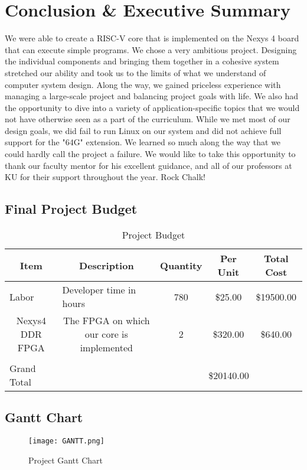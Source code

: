 \documentclass{article}
\begin{document}
\section{Conclusion \& Executive Summary}
We were able to create a RISC-V core that is implemented on the Nexys 4 board that can execute simple programs. We chose a very ambitious project. Designing the individual components and bringing them together in a cohesive system stretched our ability and took us to the limits of what we understand of computer system design.  Along the way, we gained priceless experience with managing a large-scale project and balancing project goals with life.  We also had the opportunity to dive into a variety of application-specific topics that we would not have otherwise seen as a part of the curriculum.  While we met most of our design goals, we did fail to run Linux on our system and did not achieve full support for the "64G" extension.  We learned so much along the way that we could hardly call the project a failure.  We would like to take this opportunity to thank our faculty mentor for his excellent guidance, and all of our professors at KU for their support throughout the year.  Rock Chalk!

\subsection{Final Project Budget}
\begin{table}[H]
\centering
\caption{Project Budget}
\label{dabudget}
\begin{tabular}{|l|c|c|c|c|}
\hline
\multicolumn{1}{|c|}{Item}            & Description                                  & Quantity & Per Unit & Total Cost \\ \hline
Labor                                 & \multicolumn{1}{l|}{Developer time in hours} & 780      & \$25.00  & \$19500.00 \\ \hline
\multicolumn{1}{|c|}{Nexys4 DDR FPGA} & The FPGA on which our core is implemented    & 2        & \$320.00 & \$640.00   \\ \hline
\multicolumn{5}{|l|}{}                                                                                                  \\ \hline
Grand Total                           &                                              & \multicolumn{3}{c|}{\$20140.00}  \\ \hline
\end{tabular}
\end{table}

\subsection{Gantt Chart}
\begin{figure}[H]
\caption{Project Gantt Chart}
\label{gantt}
\centering
\texttt{[image: GANTT.png]}
\end{figure}



\printbibliography
\end{document}

